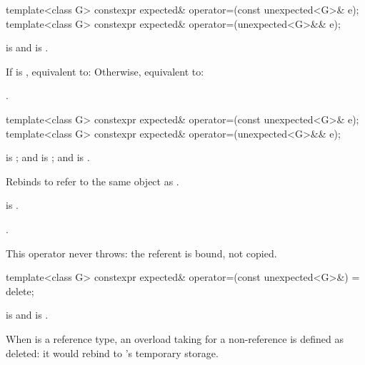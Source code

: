 %
\begin{itemdecl}
template<class G>
  constexpr expected& operator=(const unexpected<G>& e);
template<class G>
  constexpr expected& operator=(unexpected<G>&& e);
\end{itemdecl}

\begin{itemdescr}
\pnum
\constraints
{} is  and  is .

\pnum
\effects
If  is , equivalent to:  Otherwise, equivalent to: 

\pnum
\returns
{}.
\end{itemdescr}

%
\begin{itemdecl}
template<class G>
  constexpr expected& operator=(const unexpected<G>& e);
template<class G>
  constexpr expected& operator=(unexpected<G>&& e);
\end{itemdecl}

\begin{itemdescr}
\pnum
\constraints
{} is ; and  is ; and  is .

\pnum
\effects
Rebinds  to refer to the same object as .

\pnum
\ensures
{} is .

\pnum
\returns
{}.

\pnum
\remarks
This operator never throws: the referent is bound, not copied.
\end{itemdescr}

%
\begin{itemdecl}
template<class G>
  constexpr expected& operator=(const unexpected<G>&) = delete;
\end{itemdecl}

\begin{itemdescr}
\pnum
\constraints
{} is  and  is .

\pnum
\remarks
When  is a reference type, an overload taking  for a non-reference  is defined as deleted: it would rebind  to 's temporary storage.
\end{itemdescr}

